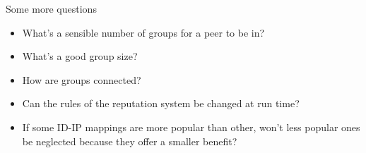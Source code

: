 \documentclass[presentation,english,usenames,dvipsnames]{beamer}
\begin{document}
\begin{frame}{Some more questions}
  \begin{itemize}
    \item What's a sensible number of groups for a peer to be in?
    \item What's a good group size?
    \item How are groups connected?
    \item Can the rules of the reputation system be changed at run time?
    \item If some ID-IP mappings are more popular than other, won't less popular
          ones be neglected because they offer a smaller benefit?
  \end{itemize}
\end{frame}
\end{document}
